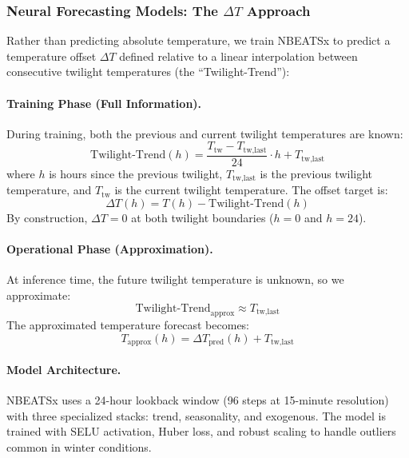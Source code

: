 \documentclass[11pt]{article}
\begin{document}
\subsubsection{Neural Forecasting Models: The \texorpdfstring{$\Delta T$}{Delta T} Approach}

Rather than predicting absolute temperature, we train NBEATSx to predict a temperature offset $\Delta T$ defined relative to a linear interpolation between consecutive twilight temperatures (the ``Twilight-Trend''):

\paragraph{Training Phase (Full Information).}
During training, both the previous and current twilight temperatures are known:
\begin{equation}
\text{Twilight-Trend}(h) = \frac{T_{\text{tw}} - T_{\text{tw,last}}}{24} \cdot h + T_{\text{tw,last}}
\end{equation}
where $h$ is hours since the previous twilight, $T_{\text{tw,last}}$ is the previous twilight temperature, and $T_{\text{tw}}$ is the current twilight temperature. The offset target is:
\begin{equation}
\Delta T(h) = T(h) - \text{Twilight-Trend}(h)
\end{equation}
By construction, $\Delta T = 0$ at both twilight boundaries ($h=0$ and $h=24$).

\paragraph{Operational Phase (Approximation).}
At inference time, the future twilight temperature is unknown, so we approximate:
\begin{equation}
\text{Twilight-Trend}_{\text{approx}} \approx T_{\text{tw,last}}
\end{equation}
The approximated temperature forecast becomes:
\begin{equation}
T_{\text{approx}}(h) = \Delta T_{\text{pred}}(h) + T_{\text{tw,last}}
\end{equation}

\paragraph{Model Architecture.}
NBEATSx uses a 24-hour lookback window (96 steps at 15-minute resolution) with three specialized stacks: trend, seasonality, and exogenous. The model is trained with SELU activation, Huber loss, and robust scaling to handle outliers common in winter conditions.
\end{document}

